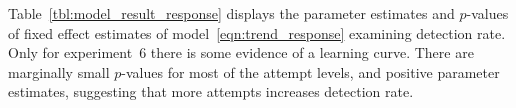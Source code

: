 \documentclass[10pt]{article}\usepackage[]{graphicx}\usepackage[]{xcolor}
\begin{document}
Table~\ref{tbl:model_result_response} displays the parameter estimates and $p$-values of fixed effect estimates of model~\eqref{eqn:trend_response} examining detection rate. Only for experiment~6 there is some evidence of a learning curve. There are marginally small $p$-values for most of the attempt levels, and positive parameter estimates, suggesting that more attempts increases detection rate. 


\end{document}
